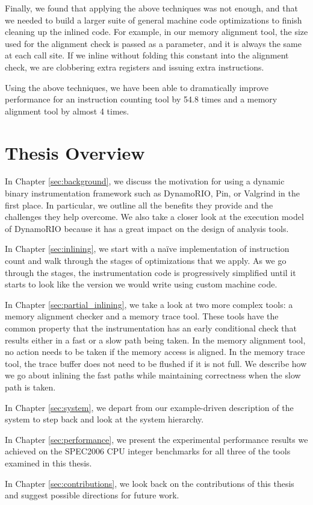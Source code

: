 Finally, we found that applying the above techniques was not enough, and that we
needed to build a larger suite of general machine code optimizations to finish
cleaning up the inlined code.  For example, in our memory alignment tool, the
size used for the alignment check is passed as a parameter, and it is always the
same at each call site.  If we inline without folding this constant into the
alignment check, we are clobbering extra registers and issuing extra
instructions.

Using the above techniques, we have been able to dramatically improve
performance for an instruction counting tool by 54.8 times and a memory
alignment tool by almost 4 times.

\section{Thesis Overview}

In Chapter \ref{sec:background}, we discuss the motivation for using a dynamic
binary instrumentation framework such as DynamoRIO, Pin, or Valgrind in the
first place.  In particular, we outline all the benefits they provide and the
challenges they help overcome.  We also take a closer look at the execution
model of DynamoRIO because it has a great impact on the design of analysis
tools.

In Chapter \ref{sec:inlining}, we start with a na\"ive implementation of
instruction count and walk through the stages of optimizations that we apply.
As we go through the stages, the instrumentation code is progressively
simplified until it starts to look like the version we would write using custom
machine code.

In Chapter \ref{sec:partial_inlining}, we take a look at two more complex tools:
a memory alignment checker and a memory trace tool.  These tools have the common
property that the instrumentation has an early conditional check that results
either in a fast or a slow path being taken.  In the memory alignment tool, no
action needs to be taken if the memory access is aligned.  In the memory trace
tool, the trace buffer does not need to be flushed if it is not full.  We
describe how we go about inlining the fast paths while maintaining correctness
when the slow path is taken.

In Chapter \ref{sec:system}, we depart from our example-driven description of
the system to step back and look at the system hierarchy.

In Chapter \ref{sec:performance}, we present the experimental performance
results we achieved on the SPEC2006 CPU integer benchmarks\cite{spec_cpu_2k6}
for all three of the tools examined in this thesis.

In Chapter \ref{sec:contributions}, we look back on the contributions of this
thesis and suggest possible directions for future work.
